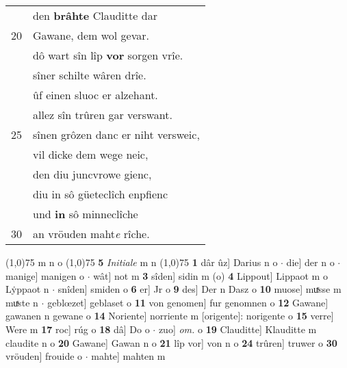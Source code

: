 \documentclass[8pt,a4paper,notitlepage]{article}
\begin{document}
\begin{table}[ht]
\begin{minipage}[t]{0.5\linewidth}
\begin{tabular}{rl}
 & den \textbf{brâhte} Clauditte dar\\ 
20 & Gawane, dem wol gevar.\\ 
 & dô wart sîn lîp \textbf{vor} sorgen vrîe.\\ 
 & sîner schilte wâren drîe.\\ 
 & ûf einen sluoc er  alzehant.\\ 
 & allez sîn trûren gar verswant.\\ 
25 & sînen grôzen danc er niht versweic,\\ 
 & vil dicke dem wege neic,\\ 
 & den diu juncvrowe gienc,\\ 
 & diu in sô güeteclîch enpfienc\\ 
 & und \textbf{in} sô minneclîche\\ 
30 & an vröuden maht\textit{e} rîche.\\ 
\end{tabular}
\scriptsize
\line(1,0){75} \newline
m n o \newline
\line(1,0){75} \newline
\textbf{5} \textit{Initiale} m n  \newline
\line(1,0){75} \newline
\textbf{1} dâr ûz] Darius n o  $\cdot$ die] der n o  $\cdot$ manige] manigen o  $\cdot$ wât] not m \textbf{3} sîden] sidin m (o) \textbf{4} Lippout] Lippaot m o Lẏppaot n  $\cdot$ snîden] smiden o \textbf{6} er] Jr o \textbf{9} des] Der n Dasz o \textbf{10} muose] muͯsse m muͯste n  $\cdot$ geblœzet] geblaset o \textbf{11} von genomen] fur genomnen o \textbf{12} Gawane] gawanen n gewane o \textbf{14} Noriente] norriente m [origente]: norigente o \textbf{15} verre] Were m \textbf{17} roc] rúg o \textbf{18} dâ] Do o  $\cdot$ zuo] \textit{om.} o \textbf{19} Clauditte] Klauditte m claudite n o \textbf{20} Gawane] Gawan n o \textbf{21} lîp vor] von n o \textbf{24} trûren] truwer o \textbf{30} vröuden] frouide o  $\cdot$ mahte] mahten m \newline
\end{minipage}
\end{table}
\newpage
\end{document}
